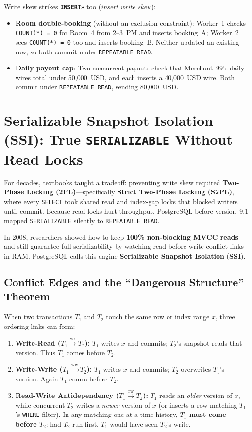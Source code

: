 Write skew strikes \textbf{\texttt{INSERT}s} too (\emph{insert write skew}):
\begin{itemize}
  \item \textbf{Room double-booking} (without an exclusion constraint): Worker~1 checks \texttt{COUNT(*) = 0} for Room~4 from 2--3~PM and inserts booking~A; Worker~2 sees \texttt{COUNT(*) = 0} too and inserts booking~B. Neither updated an existing row, so both commit under \texttt{REPEATABLE READ}.
  \item \textbf{Daily payout cap}: Two concurrent payouts check that Merchant~99's daily wires total under 50,000~USD, and each inserts a 40,000~USD wire. Both commit under \texttt{REPEATABLE READ}, sending 80,000~USD.
\end{itemize}

\section{Serializable Snapshot Isolation (SSI): True \texttt{SERIALIZABLE} Without Read Locks}
\label{ch06:ssi}

For decades, textbooks taught a tradeoff: preventing write skew required \textbf{Two-Phase Locking (2PL)}---specifically \textbf{Strict Two-Phase Locking (S2PL)}, where every \texttt{SELECT} took shared read and index-gap locks that blocked writers until commit. Because read locks hurt throughput, PostgreSQL before version~9.1 mapped \texttt{SERIALIZABLE} silently to \texttt{REPEATABLE READ}.

In 2008, researchers showed how to keep \textbf{100\% non-blocking MVCC reads} and still guarantee full serializability by watching read-before-write conflict links in RAM. PostgreSQL calls this engine \textbf{Serializable Snapshot Isolation} (\textbf{SSI}).

\subsection{Conflict Edges and the ``Dangerous Structure'' Theorem}

When two transactions $T_1$ and $T_2$ touch the same row or index range $x$, three ordering links can form:
\begin{enumerate}
  \item \textbf{Write-Read ($T_1 \xrightarrow{\mathrm{wr}} T_2$):} $T_1$ writes $x$ and commits; $T_2$'s snapshot reads that version. Thus $T_1$ comes before $T_2$.
  \item \textbf{Write-Write ($T_1 \xrightarrow{\mathrm{ww}} T_2$):} $T_1$ writes $x$ and commits; $T_2$ overwrites $T_1$'s version. Again $T_1$ comes before $T_2$.
  \item \textbf{Read-Write Antidependency ($T_1 \xrightarrow{\mathrm{rw}} T_2$):} $T_1$ reads an \emph{older} version of $x$, while concurrent $T_2$ writes a \emph{newer} version of $x$ (or inserts a row matching $T_1$'s \texttt{WHERE} filter). In any matching one-at-a-time history, \textbf{$T_1$ must come before $T_2$}: had $T_2$ run first, $T_1$ would have seen $T_2$'s write.
\end{enumerate}

